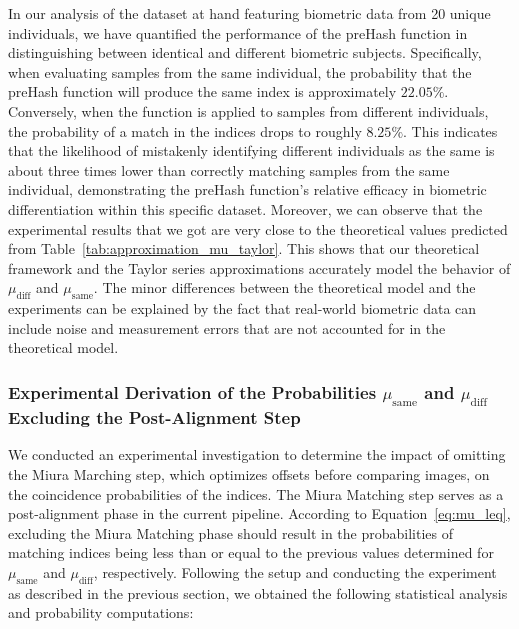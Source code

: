 In our analysis of the dataset at hand featuring biometric data from 20 unique individuals, we have quantified the performance of the preHash function in distinguishing between identical and different biometric subjects. Specifically, when evaluating samples from the same individual, the probability that the preHash function will produce the same index is approximately \(22.05\%\). Conversely, when the function is applied to samples from different individuals, the probability of a match in the indices drops to roughly \(8.25\%\). This indicates that the likelihood of mistakenly identifying different individuals as the same is about three times lower than correctly matching samples from the same individual, demonstrating the preHash function's relative efficacy in biometric differentiation within this specific dataset. Moreover, we can observe that the experimental results that we got are very close to the theoretical values predicted from Table~\ref{tab:approximation_mu_taylor}. This shows that our theoretical framework and the Taylor series approximations accurately model the behavior of \(\mu_{\text{diff}}\) and \(\mu_{\text{same}}\). The minor differences between the theoretical model and the experiments can be explained by the fact that real-world biometric data can include noise and measurement errors that are not accounted for in the theoretical model.


\subsubsection{Experimental Derivation of the Probabilities \(\mu_{\text{same}}\) and \(\mu_{\text{diff}}\) Excluding the Post-Alignment Step}

We conducted an experimental investigation to determine the impact of omitting the Miura Marching step, which optimizes offsets before comparing images, on the coincidence probabilities of the indices. The Miura Matching step serves as a post-alignment phase in the current pipeline. According to Equation~\ref{eq:mu_leq}, excluding the Miura Matching phase should result in the probabilities of matching indices being less than or equal to the previous values determined for \(\mu_{\text{same}}\) and \(\mu_{\text{diff}}\), respectively.
Following the setup and conducting the experiment as described in the previous section, we obtained the following statistical analysis and probability computations:


